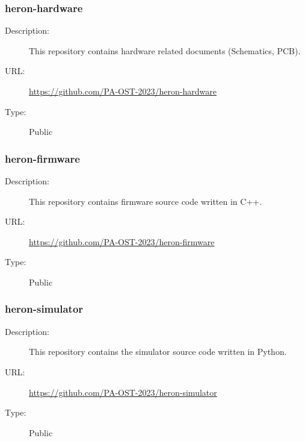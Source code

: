 \subsubsection{heron-hardware} \vspace{-0.2cm}
\begin{description}
	\item[Description:] This repository contains hardware related documents (Schematics, PCB).\vspace{-0.25cm}
	\item[URL:] \url{https://github.com/PA-OST-2023/heron-hardware}\vspace{-0.25cm}
	\item[Type:] Public\vspace{-0.25cm}
\end{description}

\subsubsection{heron-firmware} \vspace{-0.2cm}
\begin{description}
	\item[Description:] This repository contains firmware source code written in C++.\vspace{-0.25cm}
	\item[URL:] \url{https://github.com/PA-OST-2023/heron-firmware}\vspace{-0.25cm}
	\item[Type:] Public\vspace{-0.25cm}
\end{description}

\subsubsection{heron-simulator} \vspace{-0.2cm}
\begin{description}
	\item[Description:] This repository contains the simulator source code written in Python.\vspace{-0.25cm}
	\item[URL:] \url{https://github.com/PA-OST-2023/heron-simulator}\vspace{-0.25cm}
	\item[Type:] Public\vspace{-0.25cm}
\end{description}

